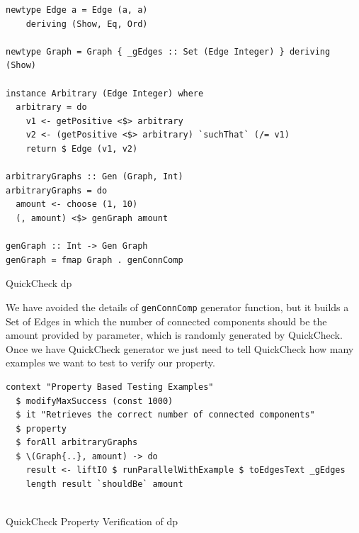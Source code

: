 \documentclass[preprint]{elsarticle}
\begin{document}
\begin{listing}[H]
  \begin{verbatim}      
newtype Edge a = Edge (a, a)
    deriving (Show, Eq, Ord)
  
newtype Graph = Graph { _gEdges :: Set (Edge Integer) } deriving (Show)
  
instance Arbitrary (Edge Integer) where
  arbitrary = do
    v1 <- getPositive <$> arbitrary
    v2 <- (getPositive <$> arbitrary) `suchThat` (/= v1)
    return $ Edge (v1, v2)
  
arbitraryGraphs :: Gen (Graph, Int)
arbitraryGraphs = do
  amount <- choose (1, 10)
  (, amount) <$> genGraph amount
  
genGraph :: Int -> Gen Graph
genGraph = fmap Graph . genConnComp
\end{verbatim}
\caption{QuickCheck \acrshort{dp}}
\label{src:haskell:7}
\end{listing}

We have avoided the details of \texttt{genConnComp} generator function, but it builds a Set of Edges 
in which the number of connected components should be the amount provided by parameter, which is randomly generated by QuickCheck.
Once we have QuickCheck generator we just need to tell QuickCheck how many examples we want to test to verify our property.

\begin{listing}[H]
\begin{verbatim}      
context "Property Based Testing Examples"
  $ modifyMaxSuccess (const 1000)
  $ it "Retrieves the correct number of connected components"
  $ property
  $ forAll arbitraryGraphs 
  $ \(Graph{..}, amount) -> do 
    result <- liftIO $ runParallelWithExample $ toEdgesText _gEdges
    length result `shouldBe` amount
    
\end{verbatim}
\caption{QuickCheck Property Verification of \acrshort{dp}}
\label{src:haskell:8}
\end{listing}
\end{document}
